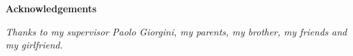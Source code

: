 \thispagestyle{empty}

\begin{center}
\newpage
\newpage

  {\bf \Huge Acknowledgements}
\end{center}

\vspace{4cm}


\emph{
  Thanks to my supervisor Paolo Giorgini, my parents, my brother, my friends and my girlfriend.
}

\newpage
